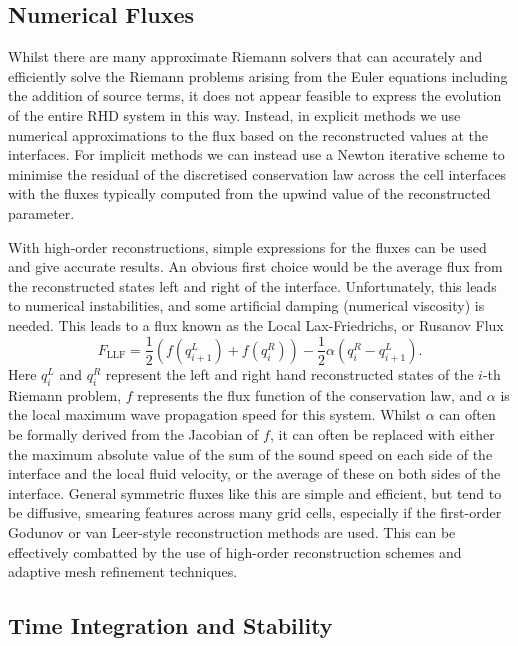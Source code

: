 \subsection{Numerical Fluxes}

Whilst there are many approximate Riemann solvers that can accurately and efficiently solve the Riemann problems arising from the Euler equations including the addition of source terms, it does not appear feasible to express the evolution of the entire RHD system in this way.
Instead, in explicit methods we use numerical approximations to the flux based on the reconstructed values at the interfaces.
For implicit methods we can instead use a Newton iterative scheme to minimise the residual of the discretised conservation law across the cell interfaces with the fluxes typically computed from the upwind value of the reconstructed parameter.

With high-order reconstructions, simple expressions for the fluxes can be used and give accurate results.
An obvious first choice would be the average flux from the reconstructed states left and right of the interface.
Unfortunately, this leads to numerical instabilities, and some artificial damping (numerical viscosity) is needed.
This leads to a flux known as the Local Lax-Friedrichs, or Rusanov Flux \citep{Rusanov1962}
\begin{equation}
    F_{\mathrm{LLF}} = \frac{1}{2}(f(q_{i+1}^L) + f(q_i^R)) - \frac{1}{2}\alpha(q_i^R - q_{i+1}^L).
\end{equation}
Here $q_i^L$ and $q_i^R$ represent the left and right hand reconstructed states of the $i$-th Riemann problem, $f$ represents the flux function of the conservation law, and $\alpha$ is the local maximum wave propagation speed for this system.
Whilst $\alpha$ can often be formally derived from the Jacobian of $f$, it can often be replaced with either the maximum absolute value of the sum of the sound speed on each side of the interface and the local fluid velocity, or the average of these on both sides of the interface.
General symmetric fluxes like this are simple and efficient, but tend to be diffusive, smearing features across many grid cells, especially if the first-order Godunov or van Leer-style reconstruction methods are used.
This can be effectively combatted by the use of high-order reconstruction schemes and adaptive mesh refinement techniques.

\subsection{Time Integration and Stability}\label{Sec:HydroStability}

